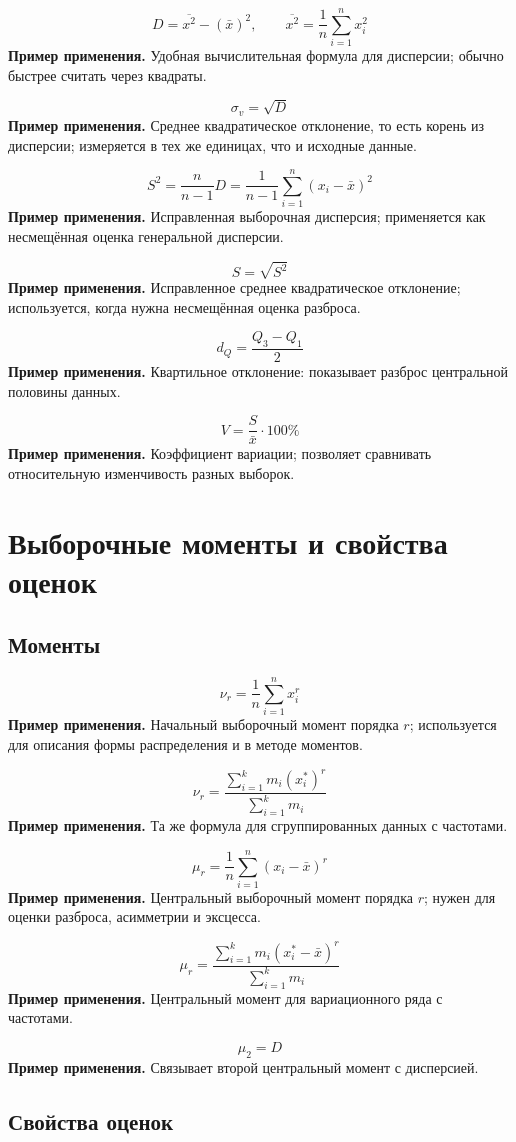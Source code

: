 \documentclass[a4paper,14pt]{extarticle}
\newcommand{\FormulaNote}[2]{%
  \begin{equation*}
  #1
  \end{equation*}
  \noindent\textbf{Пример применения.} #2\par\medskip
}
\begin{document}
\FormulaNote{D=\overline{x^2}-(\bar{x})^2,\qquad \overline{x^2}=\frac{1}{n}\sum_{i=1}^{n}x_i^2}{Удобная вычислительная формула для дисперсии; обычно быстрее считать через квадраты.}

\FormulaNote{\sigma_v=\sqrt{D}}{Среднее квадратическое отклонение, то есть корень из дисперсии; измеряется в тех же единицах, что и исходные данные.}

\FormulaNote{S^2=\frac{n}{n-1}D=\frac{1}{n-1}\sum_{i=1}^{n}(x_i-\bar{x})^2}{Исправленная выборочная дисперсия; применяется как несмещённая оценка генеральной дисперсии.}

\FormulaNote{S=\sqrt{S^2}}{Исправленное среднее квадратическое отклонение; используется, когда нужна несмещённая оценка разброса.}

\FormulaNote{d_Q=\frac{Q_3-Q_1}{2}}{Квартильное отклонение: показывает разброс центральной половины данных.}

\FormulaNote{V=\frac{S}{\bar{x}}\cdot 100\%}{Коэффициент вариации; позволяет сравнивать относительную изменчивость разных выборок.}

\section{Выборочные моменты и свойства оценок}

\subsection{Моменты}

\FormulaNote{\nu_r=\frac{1}{n}\sum_{i=1}^{n}x_i^r}{Начальный выборочный момент порядка $r$; используется для описания формы распределения и в методе моментов.}

\FormulaNote{\nu_r=\frac{\sum_{i=1}^{k}m_i(x_i^*)^r}{\sum_{i=1}^{k}m_i}}{Та же формула для сгруппированных данных с частотами.}

\FormulaNote{\mu_r=\frac{1}{n}\sum_{i=1}^{n}(x_i-\bar{x})^r}{Центральный выборочный момент порядка $r$; нужен для оценки разброса, асимметрии и эксцесса.}

\FormulaNote{\mu_r=\frac{\sum_{i=1}^{k}m_i(x_i^*-\bar{x})^r}{\sum_{i=1}^{k}m_i}}{Центральный момент для вариационного ряда с частотами.}

\FormulaNote{\mu_2=D}{Связывает второй центральный момент с дисперсией.}

\subsection{Свойства оценок}
\end{document}
